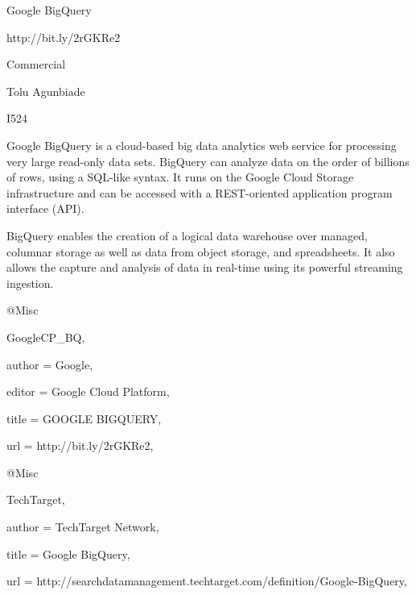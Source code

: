 Google BigQuery

http://bit.ly/2rGKRe2

Commercial

Tolu Agunbiade

I524

Google BigQuery is a cloud-based big data analytics web service for processing very large read-only data sets. BigQuery can analyze data on the order of billions of rows, using a SQL-like syntax. It runs on the Google Cloud Storage infrastructure and can be accessed with a REST-oriented application program interface (API)\cite{TechTarget}.

BigQuery enables the creation of a logical data warehouse over managed, columnar storage as well as data from object storage, and spreadsheets. It also allows the capture and analysis of data in real-time using its powerful streaming ingestion\cite{GoogleCP_BQ}.

@Misc{GoogleCP_BQ,

  author = {Google},

  editor = {Google Cloud Platform},

  title  = {GOOGLE BIGQUERY},

  url    = {http://bit.ly/2rGKRe2},

}


@Misc{TechTarget,

  author = {TechTarget Network},

  title  = {Google BigQuery},

  url    = {http://searchdatamanagement.techtarget.com/definition/Google-BigQuery},

}


